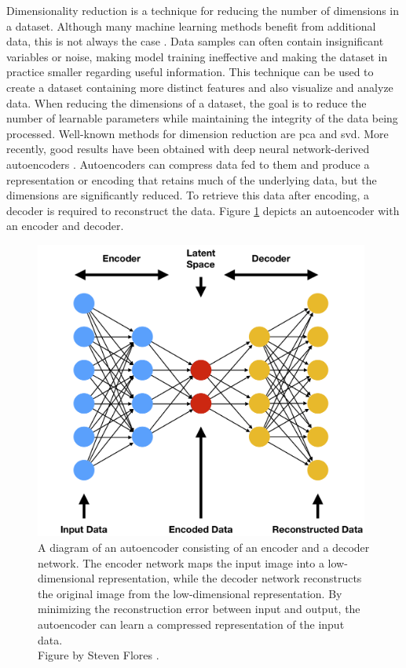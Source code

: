         Dimensionality reduction is a technique for reducing the number of dimensions in a dataset. 
        Although many machine learning methods benefit from additional data, this is not always the case \cite{belkinReconcilingModernMachinelearning2019, nakkiranDeepDoubleDescent2021}. Data samples can often contain insignificant variables or noise, making model training ineffective and making the dataset in practice smaller regarding useful information. This technique can be used to create a dataset containing more distinct features and also visualize and analyze data. When reducing the dimensions of a dataset, the goal is to reduce the number of learnable parameters while maintaining the integrity of the data being processed. Well-known methods for dimension reduction are \gls{pca} and \gls{svd}. More recently, good results have been obtained with deep neural network-derived autoencoders \cite{sakuradaAnomalyDetectionUsing2014}. Autoencoders can compress data fed to them and produce a representation or encoding that retains much of the underlying data, but the dimensions are significantly reduced.
        To retrieve this data after encoding, a decoder is required to reconstruct the data. Figure \ref{fig:auto_encoder} depicts an autoencoder with an encoder and decoder.

        \begin{figure}[htb]
            \centering
            \includegraphics[width=11cm]{images/auto_encoder.png}
            \caption{A diagram of an autoencoder consisting of an encoder and a decoder network. The encoder network maps the input image into a low-dimensional representation, while the decoder network reconstructs the original image from the low-dimensional representation. By minimizing the reconstruction error between input and output, the autoencoder can learn a compressed representation of the input data.\\Figure by Steven Flores \cite{floresVariationalAutoencodersAre2019}.}
            \label{fig:auto_encoder}
        \end{figure} 
        
